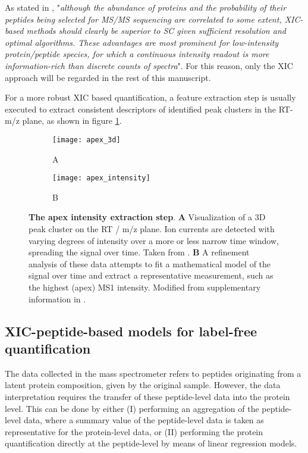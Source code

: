 As stated in \cite{Cox2014}, "\textit{although the abundance of proteins and the probability of their peptides being selected for \ac{MS/MS} sequencing are correlated to some extent, \ac{XIC}-based methods should clearly be superior to \ac{SC} given sufficient resolution and optimal algorithms. These advantages are most prominent for low-intensity protein/peptide species, for which a continuous intensity readout is more information-rich than discrete counts of spectra}". For this reason, only the \ac{XIC} approach will be regarded in the rest of this manuscript.  

For a more robust XIC based quantification, a feature extraction step is usually executed to extract consistent descriptors of identified peak clusters in the RT-m/z plane, as shown in figure \ref{figure:moff_apex}.

\begin{figure}[!h]
\centering
\begin{subfigure}{1\textwidth}
\centering
\caption*{A}
\texttt{[image: apex\_3d]}
\end{subfigure}
\bigskip
\begin{subfigure}{1\textwidth}
\centering
\caption*{B}
\texttt{[image: apex\_intensity]}
\end{subfigure}
\caption[Apex MS1 intensity module]{\textbf{The apex intensity extraction step}. \textbf{A} Visualization of a 3D peak cluster on the RT / m/z plane. Ion currents are detected with varying degrees of intensity over a more or less narrow time window, spreading the signal over time. Taken from \cite{Smith2014}. \textbf{B} A refinement analysis of these data attempts to fit a mathematical model of the signal over time and extract a representative measurement, such as the highest (apex) \ac{MS1} intensity. Modified from supplementary information in \cite{Argentini2016}.}
\label{figure:moff_apex}
\end{figure}


\subsection{\ac{XIC}-peptide-based models for label-free quantification}
\label{subsec:peptide_model}

The data collected in the mass spectrometer refers to peptides originating from a latent protein composition, given by the original sample. However, the data interpretation requires the transfer of these peptide-level data into the protein level. This can be done by either (I) performing an aggregation of the peptide-level data, where a summary value of the peptide-level data is taken as representative for the protein-level data, or (II) performing the protein quantification directly at the peptide-level by means of linear regression models.

